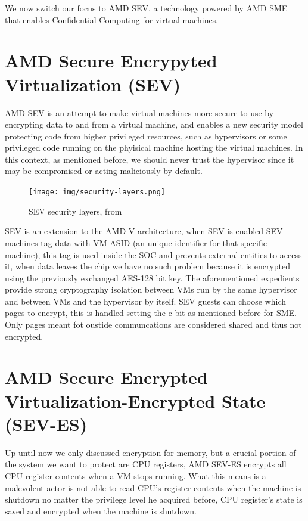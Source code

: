 \documentclass[twocolumn]{article}
\begin{document}
We now switch our focus to AMD SEV, a technology powered by AMD SME that enables Confidential Computing for virtual machines.

\section{AMD Secure Encrypyted Virtualization (SEV)}

AMD SEV is an attempt to make virtual machines more secure to use by encrypting data to and from a virtual machine, and enables a new security model protecting code from higher privileged resources, such as hypervisors or some privileged code running on the phyisical machine hosting the virtual machines. In this context, as mentioned before, we should never trust the hypervisor since it may be compromised or acting maliciously by default.

\begin{figure}
    \centering
    \texttt{[image: img/security-layers.png]}
    \caption{SEV security layers, from \cite{memory-encryption}}
\end{figure}

SEV is an extension to the AMD-V architecture, when SEV is enabled SEV machines tag data with VM ASID (an unique identifier for that specific machine), this tag is used inside the SOC and prevents external entities to access it, when data leaves the chip we have no such problem because it is encrypted using the previously exchanged AES-128 bit key. The aforementioned expedients provide strong cryptography isolation between VMs run by the same hypervisor and between VMs and the hypervisor by itself. SEV guests can choose which pages to encrypt, this is handled setting the c-bit as mentioned before for SME. Only pages meant fot oustide communcations are considered shared and thus not encrypted.

\section{AMD Secure Encrypted Virtualization-Encrypted State (SEV-ES)}

Up until now we only discussed encryption for memory, but a crucial portion of the system we want to protect are CPU registers, AMD SEV-ES encrypts all CPU register contents when a VM stops running. What this means is a malevolent actor is not able to read CPU's register contents when the machine is shutdown no matter the privilege level he acquired before, CPU register's state is saved and encrypted when the machine is shutdown.
\end{document}
